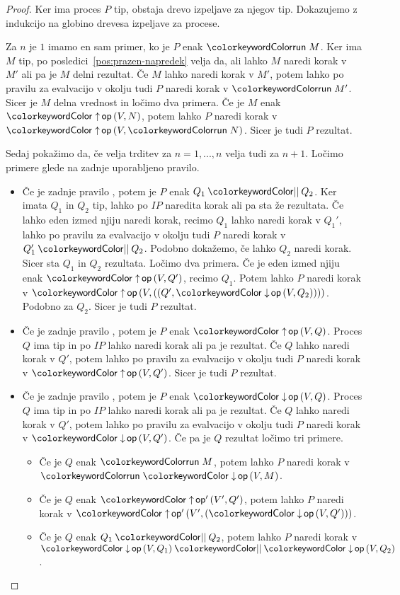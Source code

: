 \begin{proof}
	Ker ima proces $P$ tip, obstaja drevo izpeljave za njegov tip.
	Dokazujemo z indukcijo na globino drevesa izpeljave za procese.
	
	Za $n$ je $1$ imamo en sam primer, ko je $P$ enak $\tmrun{M}$. Ker ima $M$ tip, po posledici~\ref{pos:prazen-napredek} velja da, ali lahko $M$ naredi korak v $M'$ ali pa je $M$ delni rezultat.
	Če $M$ lahko naredi korak v $M'$, potem lahko po pravilu za evalvacijo v okolju tudi $P$ naredi korak v $\tmrun{M'}$.
	Sicer je $M$ delna vrednost in ločimo dva primera.
	Če je $M$ enak $\tmopout{op}{V}{N}$, potem lahko $P$ naredi korak v $\tmopout{op}{V}{\tmrun{N}}$.
	Sicer je tudi $P$ rezultat.
	
	Sedaj pokažimo da, če velja trditev za $n = 1,...,n$ velja tudi za $n+1$.
	Ločimo primere glede na zadnje uporabljeno pravilo.
	
	\begin{itemize}
		\item Če je zadnje pravilo , potem je $P$ enak $\tmpar{Q_1}{Q_2}$. Ker imata $Q_1$ in $Q_2$ tip, lahko po $IP$ naredita korak ali pa sta že rezultata.
		Če lahko eden izmed njiju naredi korak, recimo $Q_1$ lahko naredi korak v $Q_1'$, lahko po pravilu za evalvacijo v okolju tudi $P$ naredi korak v $\tmpar{Q_1'}{Q_2}$. Podobno dokažemo, če lahko $Q_2$ naredi korak.
		Sicer sta $Q_1$ in $Q_2$ rezultata. Ločimo dva primera.
		Če je eden izmed njiju enak $\tmopout{op}{V}{Q'}$, recimo $Q_1$. Potem lahko $P$ naredi korak v $\tmopout{op}{V}{(\tmpair{Q'}{\tmopin{op}{V}{Q_2}})}$. Podobno za $Q_2$.
		Sicer je tudi $P$ rezultat.
		
		\item Če je zadnje pravilo , potem je $P$ enak $\tmopout{op}{V}{Q}$. Proces $Q$ ima tip in po $IP$ lahko naredi korak ali pa je rezultat.
		Če $Q$ lahko naredi korak v $Q'$, potem lahko po pravilu za evalvacijo v okolju tudi $P$ naredi korak v $\tmopout{op}{V}{Q'}$.
		Sicer je tudi $P$ rezultat.
		
		\item Če je zadnje pravilo , potem je $P$ enak $\tmopin{op}{V}{Q}$. Proces $Q$ ima tip in po $IP$ lahko naredi korak ali pa je rezultat.
		Če $Q$ lahko naredi korak v $Q'$, potem lahko po pravilu za evalvacijo v okolju tudi $P$ naredi korak v $\tmopin{op}{V}{Q'}$.
		Če pa je $Q$ rezultat ločimo tri primere.
		\begin{itemize}
			\item Če je $Q$ enak $\tmrun{M}$, potem lahko $P$ naredi korak v $\tmrun{\tmopin{op}{V}{M}}$.
			\item Če je $Q$ enak $\tmopout{op'}{V'}{Q'}$, potem lahko $P$ naredi korak v $\tmopout{op'}{V'}{(\tmopin{op}{V}{Q'})}$.
			\item Če je $Q$ enak $\tmpar{Q_1}{Q_2}$, potem lahko $P$ naredi korak v $\tmpar{\tmopin{op}{V}{Q_1}}{\tmopin{op}{V}{Q_2}}$.
		\end{itemize}
		
	\end{itemize}
		
\end{proof}



